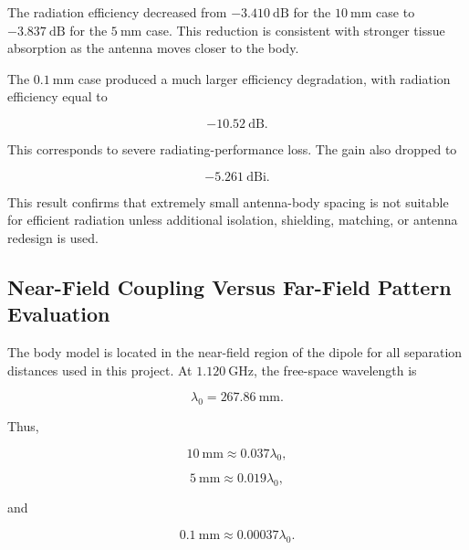 \begin{table}[htbp]
\centering
\caption{Efficiency and gain comparison at \(1.120~\mathrm{GHz}\).}
\label{tab:engineering-efficiency-gain-comparison}
\end{table}

The radiation efficiency decreased from \(-3.410~\mathrm{dB}\) for the \(10~\mathrm{mm}\) case to \(-3.837~\mathrm{dB}\) for the \(5~\mathrm{mm}\) case. This reduction is consistent with stronger tissue absorption as the antenna moves closer to the body.

The \(0.1~\mathrm{mm}\) case produced a much larger efficiency degradation, with radiation efficiency equal to

\[
-10.52~\mathrm{dB}.
\]

This corresponds to severe radiating-performance loss. The gain also dropped to

\[
-5.261~\mathrm{dBi}.
\]

This result confirms that extremely small antenna-body spacing is not suitable for efficient radiation unless additional isolation, shielding, matching, or antenna redesign is used.

\subsection{Near-Field Coupling Versus Far-Field Pattern Evaluation}

The body model is located in the near-field region of the dipole for all separation distances used in this project. At \(1.120~\mathrm{GHz}\), the free-space wavelength is

\[
\lambda_0 = 267.86~\mathrm{mm}.
\]

Thus,

\[
10~\mathrm{mm} \approx 0.037\lambda_0,
\]

\[
5~\mathrm{mm} \approx 0.019\lambda_0,
\]

and

\[
0.1~\mathrm{mm} \approx 0.00037\lambda_0.
\]

